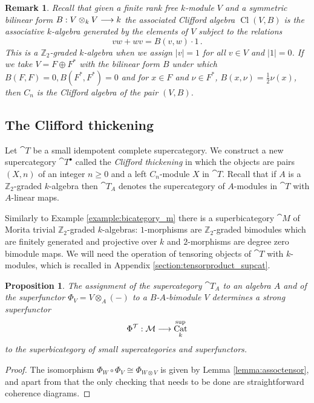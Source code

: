 \documentclass[english,letter paper,12pt,leqno]{article}
\newtheorem{proposition}[theorem]{Proposition}
\theoremstyle{example}
\newtheorem{remark}[theorem]{Remark}
\numberwithin{equation}{section}
\DeclareMathOperator{\Cat}{Cat}
\begin{document}
\begin{remark} Recall that given a finite rank free $k$-module $V$ and a symmetric bilinear form $B: V \otimes_k V \longrightarrow k$ the associated Clifford algebra $\operatorname{Cl}(V, B)$ is the associative $k$-algebra generated by the elements of $V$ subject to the relations
\[
vw + wv = B(v,w) \cdot 1\,.
\]
This is a $\mathbb{Z}_2$-graded $k$-algebra when we assign $|v| = 1$ for all $v \in V$ and $|1| = 0$. If we take $V = F \oplus F^*$ with the bilinear form $B$ under which $B(F,F) = 0, B(F^*, F^*) = 0$ and for $x \in F$ and $\nu \in F^*$, $B(x, \nu) = \frac{1}{2} \nu(x)$, then $C_n$ is the Clifford algebra of the pair $(V,B)$.
\end{remark}

\subsection{The Clifford thickening}\label{section:cliff_thick}

Let $\cat{T}$ be a small idempotent complete supercategory. We construct a new supercategory $\cat{T}^\bullet$ called the \emph{Clifford thickening} in which the objects are pairs $(X,n)$ of an integer $n \ge 0$ and a left $C_n$-module $X$ in $\cat{T}$. Recall that if $A$ is a $\mathbb{Z}_2$-graded $k$-algebra then $\cat{T}_A$ denotes the supercategory of $A$-modules in $\cat{T}$ with $A$-linear maps.


Similarly to Example \ref{example:bicategory_m} there is a superbicategory $\cat{M}$ of Morita trivial $\mathbb{Z}_2$-graded $k$-algebras: $1$-morphisms are $\mathbb{Z}_2$-graded bimodules which are finitely generated and projective over $k$ and $2$-morphisms are degree zero bimodule maps. We will need the operation of tensoring objects of $\cat{T}$ with $k$-modules, which is recalled in Appendix \ref{section:tensorproduct_supcat}. 

\begin{proposition} The assignment of the supercategory $\cat{T}_A$ to an algebra $A$ and of the superfunctor $\Phi_V = V \otimes_A (-)$ to a $B$-$A$-bimodule $V$ determines a strong superfunctor
\[
\Phi^{\cat{T}}: \cat{M} \lto \Cat^{\operatorname{sup}}_k
\]
to the superbicategory of small supercategories and superfunctors.
\end{proposition}
\begin{proof}
The isomorphism $\Phi_W \circ \Phi_V \cong \Phi_{W \otimes V}$ is given by Lemma \ref{lemma:assoctensor}, and apart from that the only checking that needs to be done are straightforward coherence diagrams.
\end{proof}
\end{document}
